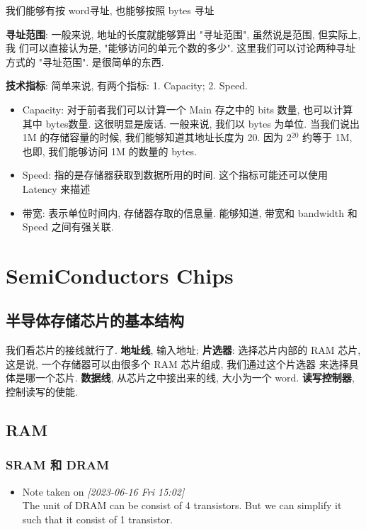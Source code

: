 \documentclass[11pt]{article}
\begin{document}
我们能够有按 word寻址, 也能够按照 bytes 寻址

\textbf{寻址范围}: 一般来说, 地址的长度就能够算出 "寻址范围", 虽然说是范围, 但实际上, 我
们可以直接认为是, "能够访问的单元个数的多少". 这里我们可以讨论两种寻址
方式的 "寻址范围". 是很简单的东西.


\textbf{技术指标}: 简单来说, 有两个指标: 1. Capacity; 2. Speed. 

\begin{itemize}
\item Capacity: 对于前者我们可以计算一个 Main 存之中的 bits 数量, 也可以计算其中 bytes数量. 这很明显是废话. 一般来说, 我们以 bytes 为单位. 当我们说出 1M 的存储容量的时候, 我们能够知道其地址长度为 20. 因为 2\(^{\text{20}}\) 约等于 1M, 也即, 我们能够访问 1M 的数量的 bytes.
\item Speed: 指的是存储器获取到数据所用的时间. 这个指标可能还可以使用 Latency 来描述
\item 带宽: 表示单位时间内, 存储器存取的信息量. 能够知道, 带宽和 bandwidth 和 Speed 之间有强关联.
\end{itemize}

\section{SemiConductors Chips}
\label{sec:org82a718b}
\subsection{半导体存储芯片的基本结构}
\label{sec:orgb82506e}

我们看芯片的接线就行了. \textbf{地址线}, 输入地址; \textbf{片选器}: 选择芯片内部的 RAM
芯片, 这是说, 一个存储器可以由很多个 RAM 芯片组成, 我们通过这个片选器
来选择具体是哪一个芯片.  \textbf{数据线}, 从芯片之中接出来的线, 大小为一个
word. \textbf{读写控制器}, 控制读写的使能.

\subsection{RAM}
\label{sec:orgb9f1d80}
\subsubsection{SRAM 和 DRAM}
\label{sec:org7e437bc}
\begin{itemize}
\item Note taken on \textit{[2023-06-16 Fri 15:02] } \\
The unit of DRAM can be consist of 4 transistors. But we can simplify it such that it consist of 1 transistor.
\end{itemize}
\end{document}
